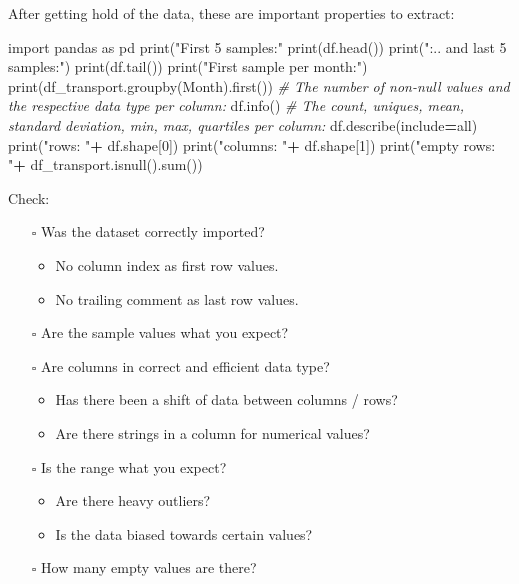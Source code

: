 \documentclass[
]{book}
\newenvironment{Shaded}{\begin{snugshade}}{\end{snugshade}}
\newcommand{\BuiltInTok}[1]{#1}
\newcommand{\CommentTok}[1]{\textcolor[rgb]{0.56,0.35,0.01}{\textit{#1}}}
\newcommand{\DecValTok}[1]{\textcolor[rgb]{0.00,0.00,0.81}{#1}}
\newcommand{\ImportTok}[1]{#1}
\newcommand{\NormalTok}[1]{#1}
\newcommand{\OperatorTok}[1]{\textcolor[rgb]{0.81,0.36,0.00}{\textbf{#1}}}
\newcommand{\StringTok}[1]{\textcolor[rgb]{0.31,0.60,0.02}{#1}}
\begin{document}
After getting hold of the data, these are important properties to
extract:

\begin{Shaded}
\begin{Highlighting}[]
\ImportTok{import}\NormalTok{ pandas }\ImportTok{as}\NormalTok{ pd}
\BuiltInTok{print}\NormalTok{(}\StringTok{"First 5 samples:"}
\BuiltInTok{print}\NormalTok{(df.head())}
\BuiltInTok{print}\NormalTok{(}\StringTok{":.. and last 5 samples:"}\NormalTok{)}
\BuiltInTok{print}\NormalTok{(df.tail())}
\BuiltInTok{print}\NormalTok{(}\StringTok{"First sample per month:"}\NormalTok{)}
\BuiltInTok{print}\NormalTok{(df\_transport.groupby(}\StringTok{\textquotesingle{}Month\textquotesingle{}}\NormalTok{).first())}
\CommentTok{\# The number of non{-}null values and the respective data type per column:}
\NormalTok{df.info() }
\CommentTok{\# The count, uniques, mean, standard deviation, min, max, quartiles per column:}
\NormalTok{df.describe(include}\OperatorTok{=}\StringTok{\textquotesingle{}all\textquotesingle{}}\NormalTok{) }
\BuiltInTok{print}\NormalTok{(}\StringTok{"rows: "}\OperatorTok{+}\NormalTok{ df.shape[}\DecValTok{0}\NormalTok{])}
\BuiltInTok{print}\NormalTok{(}\StringTok{"columns: "}\OperatorTok{+}\NormalTok{ df.shape[}\DecValTok{1}\NormalTok{])}
\BuiltInTok{print}\NormalTok{(}\StringTok{"empty rows: "}\OperatorTok{+}\NormalTok{ df\_transport.isnull().}\BuiltInTok{sum}\NormalTok{())}
\end{Highlighting}
\end{Shaded}

Check:

\begin{itemize}
\item[$\square$]
  Was the dataset correctly imported?

  \begin{itemize}
  \item
    No column index as first row values.
  \item
    No trailing comment as last row values.
  \end{itemize}
\item[$\square$]
  Are the sample values what you expect?
\item[$\square$]
  Are columns in correct and efficient data type?

  \begin{itemize}
  \item
    Has there been a shift of data between columns / rows?
  \item
    Are there strings in a column for numerical values?
  \end{itemize}
\item[$\square$]
  Is the range what you expect?

  \begin{itemize}
  \item
    Are there heavy outliers?
  \item
    Is the data biased towards certain values?
  \end{itemize}
\item[$\square$]
  How many empty values are there?
\end{itemize}
\end{document}
